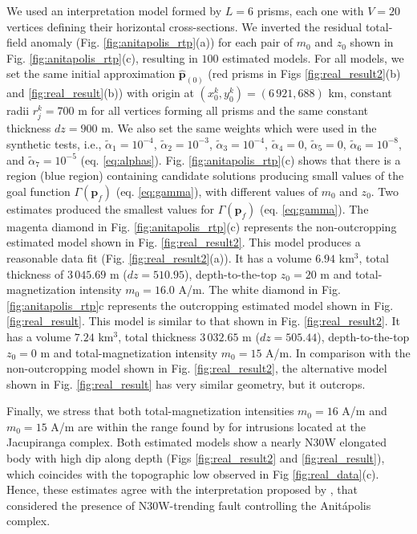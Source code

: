 We used an interpretation model formed by $L = 6$ prisms, each one with 
$V = 20$ vertices defining their horizontal cross-sections.
We inverted the residual total-field anomaly (Fig. \ref{fig:anitapolis_rtp}(a)) for each 
pair of $m_0$ and $z_0$ shown in Fig. \ref{fig:anitapolis_rtp}(c), resulting in $100$ estimated 
models. 
For all models, we set the same initial approximation $\hat{\mathbf{p}}_{(0)}$ 
(red prisms in Figs \ref{fig:real_result2}(b) and \ref{fig:real_result}(b)) 
with origin at $(x_0^k, y_0^k) = (6\,921, 688)$ km, constant radii $r_j^k = 700$ m for 
all vertices forming all prisms and the same constant thickness $dz = 900$ m.
We also set the same weights which were used in the synthetic tests, i.e., 
$\tilde{\alpha}_1 = 10^{-4}$, 
$\tilde{\alpha}_2 = 10^{-3}$, 
$\tilde{\alpha}_3 = 10^{-4}$, 
$\tilde{\alpha}_4 = 0$, 
$\tilde{\alpha}_5 = 0$, 
$\tilde{\alpha}_6 = 10^{-8}$, and 
$\tilde{\alpha}_7 = 10^{-5}$ (eq. \ref{eq:alphas}). 
Fig. \ref{fig:anitapolis_rtp}(c) shows that there is a region (blue region) containing 
candidate solutions producing small values of the goal function 
$\Gamma(\mathbf{p}_f)$ (eq. \ref{eq:gamma}), with different values of $m_0$ and $z_0$.
Two estimates produced the smallest values for $ \Gamma(\mathbf{p}_f) $ (eq. \ref{eq:gamma}). 
The magenta diamond in Fig. \ref{fig:anitapolis_rtp}(c) represents the 
non-outcropping estimated model shown in Fig. \ref{fig:real_result2}. 
This model produces a reasonable data fit (Fig. \ref{fig:real_result2}(a)). 
It has a volume $ 6.94 $ km$ ^3 $, total thickness of $ 3\,045.69 $ m 
($ dz = 510.95 $), depth-to-the-top $z_0 = 20$ m and total-magnetization intensity 
$m_0 = 16.0$ A/m.
The white diamond in Fig. \ref{fig:anitapolis_rtp}{c} represents the outcropping estimated  
model shown in Fig. \ref{fig:real_result}. This model is similar to that shown in 
Fig. \ref{fig:real_result2}. It has a volume $ 7.24 $ km$ ^3 $, total thickness 
$ 3\,032.65 $ m ($ dz = 505.44 $), depth-to-the-top $z_0 = 0$ m and 
total-magnetization intensity $m_0 = 15$ A/m.  
In comparison with the non-outcropping model shown in Fig. \ref{fig:real_result2}, the 
alternative model shown in Fig. \ref{fig:real_result} has very similar geometry,
but it outcrops.

Finally, we stress that both total-magnetization intensities $m_0 = 16$  A/m and  $m_0 = 15$ A/m 
are within the range found by  \citet{valdivia-2009} for intrusions located at the Jacupiranga complex.
Both estimated models show a nearly N30W elongated body with high dip 
along depth (Figs \ref{fig:real_result2} and \ref{fig:real_result}), 
which coincides with the topographic low observed in Fig \ref{fig:real_data}(c). 
Hence, these estimates agree with the interpretation proposed by 
\citet{horbach-marimon1980}, that considered the presence of N30W-trending fault 
controlling the Anit{\'a}polis complex.